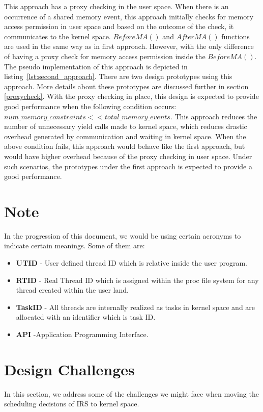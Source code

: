 This approach has a proxy checking in the user space. 
When there is an occurrence of a shared memory event, this approach initially checks for memory access permission in user space and based on the outcome of the check, it communicates to the kernel space. 
$BeforeMA()$ and $AfterMA()$ functions are used in the same way as in first approach. 
However, with the only difference of having a proxy check for memory access permission inside the $BeforeMA()$. 
The pseudo implementation of this approach is depicted in listing~\ref{lst:second_approach}.
There are two design prototypes using this approach. More details about these prototypes are discussed further in section \ref{proxycheck}.
With the proxy checking in place, this design is expected to provide good performance when the following condition occurs: $num\_memory\_constraints << total\_memory\_events$. 
This approach reduces the number of unnecessary yield calls made to kernel space, which reduces drastic overhead generated by communication and waiting in kernel space. 
When the above condition fails, this approach would behave like the first approach, but would have higher overhead because of the proxy checking in user space. 
Under such scenarios, the prototypes under the first approach is expected to provide a good performance. 


\section*{Note}
In the progression of this document, we would be using certain acronyms to indicate certain meanings. 
Some of them are:
\begin{itemize}
\item \textbf{UTID} - User defined thread ID which is relative inside the user program. 
\item \textbf{RTID} - Real Thread ID which is assigned within the proc file system for any thread created within the user land. 
\item \textbf{TaskID} - All threads are internally realized as tasks in kernel space and are allocated with an identifier which is task ID.
\item \textbf{API} -Application Programming Interface.
\end{itemize}

\section{Design Challenges}

In this section, we address some of the challenges we might face when moving the scheduling decisions of IRS to kernel space.

